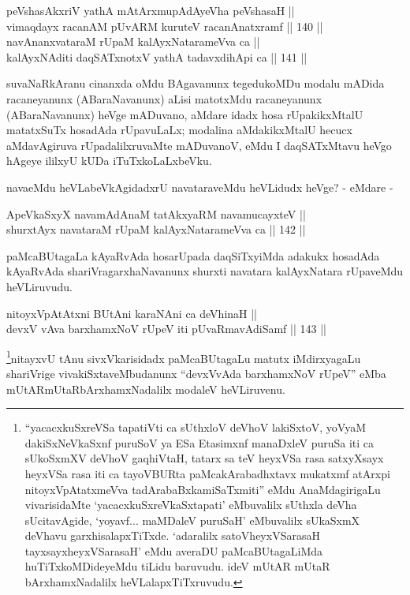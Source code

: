 
\begin{shl}
peVshasAkxriV yathA mAtArxmupAdAyeVha peVshasaH || \\
vimaqdayx racanAM pUvARM kuruteV racanAnatxramf \hfill || 140 ||  \\
navAnanxvataraM rUpaM kalAyxNatarameVva ca || \\
kalAyxNAditi daqSATxnotxV yathA tadavxdihApi ca \hfill || 141 ||  
\end{shl}

\begin{artha}
suvaNaRkAranu cinanxda oMdu BAgavanunx tegedukoMDu modalu mADida
racaneyanunx (ABaraNavanunx) aLisi matotxMdu racaneyanunx
(ABaraNavanunx) heVge mADuvano, aMdare idadx hosa rUpakikxMtalU
matatxSuTx hosadAda rUpavuLaLx; modalina aMdakikxMtalU hecucx
aMdavAgiruva rUpadalilxruvaMte mADuvanoV, eMdu I daqSATxMtavu heVgo
hAgeye ililxyU kUDa iTuTxkoLaLxbeVku.
\end{artha}

\begin{artha}
navaeMdu heVLabeVkAgidadxrU navataraveMdu heVLidudx heVge? - eMdare -
\end{artha}

\begin{shl}
ApeVkaSxyX navamAdAnaM tatAkxyaRM navamucayxteV || \\
shurxtAyx navataraM rUpaM kalAyxNatarameVva ca \hfill || 142 ||  
\end{shl}

\begin{artha}
paMcaBUtagaLa kAyaRvAda hosarUpada daqSiTxyiMda adakukx hosadAda
kAyaRvAda shariVragarxhaNavanunx shurxti navatara kalAyxNatara
rUpaveMdu heVLiruvudu.
\end{artha}


\begin{shl}
nitoyxVpAtAtxni BUtAni karaNAni ca deVhinaH || \\
devxV vAva barxhamxNoV rUpeV iti pUvaRmavAdiSamf \hfill || 143 ||  
\end{shl}

\begin{artha}
\footnote{``yacacxkuSxreVSa tapatiVti ca sUthxloV deVhoV lakiSxtoV, yoV\s yaM dakiSxNeV\s kaSxnf puruSoV ya ESa Etasimxnf manaDxleV puruSa iti ca sUkoSxmXV deVhoV gaqhiVtaH, tatarx sa teV heyxVSa rasa satxyXsayx heyxVSa rasa iti ca tayoVBURta paMcakArabadhxtavx mukatxmf atArxpi nitoyxVpAtatxmeVva tadArabaBxkamiSaTxmiti'' eMdu AnaMdagirigaLu vivarisidaMte `yacacxkuSxreVkaSxtapati' eMbuvalilx sUthxla deVha sUcitavAgide, `yo\s yavf... maMDaleV
puruSaH' eMbuvalilx sUkaSxmX deVhavu garxhisalapxTiTxde. `adaralilx
satoVheyxVSarasaH tayxsayxheyxVSarasaH' eMdu averaDU
paMcaBUtagaLiMda huTiTxkoMDideyeMdu tiLidu baruvudu. ideV mUtAR
mUtaR bArxhamxNadalilx heVLalapxTiTxruvudu.}nitayxvU tAnu sivxVkarisidadx paMcaBUtagaLu matutx iMdirxyagaLu
shariVrige vivakiSxtaveMbudanunx ``devxVvAda barxhamxNoV rUpeV'' eMba
mUtARmUtaRbArxhamxNadalilx modaleV heVLiruvenu.
\end{artha}

